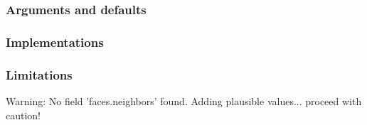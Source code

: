 \subsubsection{Arguments and defaults}

\subsubsection{Implementations}

\subsubsection{Limitations}

\begin{codeError}
Warning: No field 'faces.neighbors' found. Adding plausible values... proceed with caution! 
\end{codeError}
